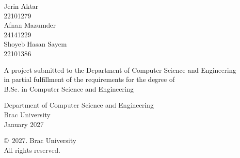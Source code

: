 \begin{titlepage}
\renewcommand*{\thepage}{Title} %

    \begin{center}
        \vspace*{3cm} %

        {\fontsize{16pt}{22pt}\selectfont{AI-Powered Legal Document Analysis System:\\
        Clause Detection, Category-Level Risk Prioritization\\
        and Plain-Language Explanation on CUAD}
        } %

        \vspace{1.5cm}


        \vspace{0.5cm}

        	Jerin Aktar\\
	        22101279\\
	        Afnan Mazumder\\
	        24141229\\
	        Shoyeb Hasan Sayem\\
	        22101386

        \vspace{1.5cm}

        	A project submitted to the Department of Computer Science and Engineering\\
            in partial fulfillment of the requirements for the degree of\\
            B.Sc. in Computer Science and Engineering


        \vspace{2.5cm}

    		Department of Computer Science and Engineering\\
            Brac University\\
            January 2027

        \vspace{3cm}

    		\copyright\ 2027. Brac University\\
            All rights reserved.

    \end{center}

\end{titlepage}

